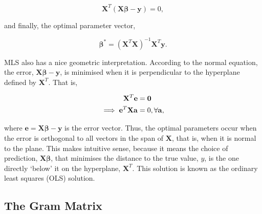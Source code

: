 \documentclass[11pt]{amsart}
\begin{document}
$$\mathbf{X}^T(\mathbf{X}\boldsymbol\beta - \mathbf{y}) = 0,$$

and finally, the optimal parameter vector,

$$\boldsymbol\beta^* = (\mathbf{X}^T\mathbf{X})^{-1}\mathbf{X}^T\mathbf{y}.$$

MLS also has a nice geometric interpretation. According to the normal equation, the error, $\mathbf{X}\boldsymbol\beta - \mathbf{y}$, is minimised when it is perpendicular to the hyperplane defined by $\mathbf{X}^T$. That is,

\begin{align}
\mathbf{X}^T\mathbf{e} &= \mathbf{0} \notag \\
\implies \mathbf{e}^T\mathbf{X}\mathbf{a} &= 0, \forall \mathbf{a}, \notag
\end{align}

where $\mathbf{e} = \mathbf{X}\boldsymbol\beta - \mathbf{y}$ is the error vector. Thus, the optimal parameters occur when the error is orthogonal to all vectors in the span of $\mathbf{X}$, that is, when it is normal to the plane. This makes intuitive sense, because it means the choice of prediction, $\mathbf{X}\boldsymbol\beta$, that minimises the distance to the true value, $y$, is the one directly `below' it on the hyperplane, $\mathbf{X}^T$. This solution is known as the ordinary least squares (OLS) solution.

\subsection{The Gram Matrix}
\end{document}
